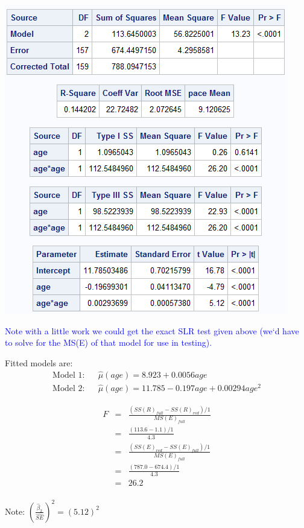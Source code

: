 \begin{flushleft}
\includegraphics[scale=0.8]{resrunquadratic}
\end{flushleft}

\textcolor{blue}{Note with a little work we could get the exact SLR test given above (we`d have to solve for the MS(E) of that model for use in testing).}

Fitted models are:
\begin{eqnarray*}
\text{Model 1:} & & \hat\mu(age)=8.923 + 0.0056 age\\
\text{Model 2:} & & \hat\mu(age) = 11.785 - 0.197 age + 0.00294 age^2
\end{eqnarray*}

\begin{eqnarray*}
F & = & \frac{(SS(R)_{full}-SS(R)_{red})/1}{MS(E)_{full}} \\
  & = & \frac{(113.6-1.1)/1}{4.3} \\
  & = & \frac{(SS(E)_{red}-SS(E)_{full})/1}{MS(E)_{full}} \\
  & = & \frac{(787.0-674.4)/1}{4.3}\\
  & = & 26.2 \\
\end{eqnarray*}

Note: $\left(\frac{\hat\beta_{ 2}}{\hat{SE}}\right)^2 = (5.12)^2$\\

